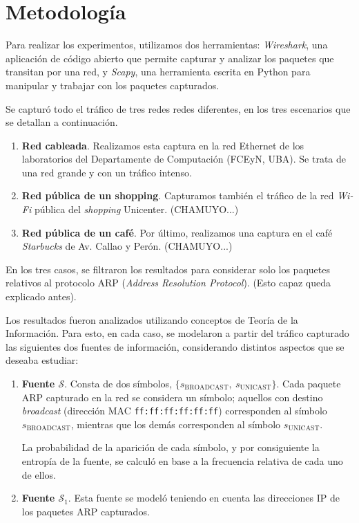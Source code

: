 \section{Metodología}

Para realizar los experimentos, utilizamos dos herramientas: \emph{Wireshark},
una aplicación de código abierto que permite capturar y analizar los paquetes
que transitan por una red, y \emph{Scapy}, una herramienta escrita en
Python para manipular y trabajar con los paquetes capturados.

Se capturó todo el tráfico de tres redes redes diferentes, en los tres
escenarios que se detallan a continuación.

\begin{enumerate}
    \item \textbf{Red cableada}. Realizamos esta captura en la red Ethernet
    de los laboratorios del Departamente de Computación (FCEyN, UBA). Se trata
    de una red grande y con un tráfico intenso.
    \item \textbf{Red pública de un shopping}. Capturamos también el tráfico
    de la red \emph{Wi-Fi} pública del \emph{shopping} Unicenter. (CHAMUYO...)
    \item \textbf{Red pública de un café}. Por último, realizamos una captura
    en el café \emph{Starbucks} de Av. Callao y Perón. (CHAMUYO...)
\end{enumerate}

En los tres casos, se filtraron los resultados para considerar solo los
paquetes relativos al protocolo ARP (\emph{Address Resolution Protocol}).
(Esto capaz queda explicado antes).

Los resultados fueron analizados utilizando conceptos de Teoría de la
Información. Para esto, en cada caso, se modelaron a partir del tráfico
capturado las siguientes dos fuentes de información, considerando distintos
aspectos que se deseaba estudiar:

\begin{enumerate}
    \item \textbf{Fuente $\mathcal{S}$}. Consta de dos símbolos, $\lbrace
    s_{\text{BROADCAST}},\ s_{\text{UNICAST}} \rbrace$. Cada paquete ARP
    capturado en la red se considera un símbolo; aquellos con destino
    \emph{broadcast} (dirección MAC \texttt{ff:ff:ff:ff:ff:ff}) corresponden
    al símbolo $s_{\text{BROADCAST}}$, mientras que los demás corresponden
    al símbolo $s_{\text{UNICAST}}$.

    La probabilidad de la aparición de cada símbolo, y por consiguiente
    la entropía de la fuente, se calculó en base a la frecuencia relativa
    de cada uno de ellos.
    \item \textbf{Fuente $\mathcal{S}_1$}. Esta fuente se modeló teniendo en
    cuenta las direcciones IP de los paquetes ARP capturados.
\end{enumerate}

